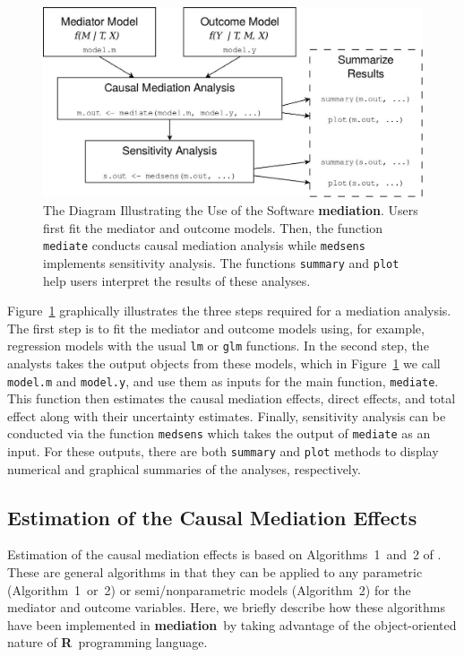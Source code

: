 \documentclass[11pt,letterpaper]{article}
\theoremstyle{plain}
\newcommand\bR{{\bf R}}
\newcommand\bmediation{{\bf mediation}}
\begin{document}
\begin{figure}[t]
  \begin{center}
    \includegraphics[scale=.35]{mediation-chart.jpg}
  \end{center}
  \caption{The Diagram Illustrating the Use of the Software
    \bmediation.  Users first fit the mediator and outcome models.
    Then, the function {\tt mediate} conducts causal mediation
    analysis while {\tt medsens} implements sensitivity analysis.  The
    functions {\tt summary} and {\tt plot} help users interpret the
    results of these analyses.} \label{fg:chart}
\end{figure}

Figure~\ref{fg:chart} graphically illustrates the three steps required
for a mediation analysis. The first step is to fit the mediator and
outcome models using, for example, regression models with the usual
\texttt{lm} or \texttt{glm} functions. In the second step, the
analysts takes the output objects from these models, which in
Figure~\ref{fg:chart} we call {\tt model.m} and {\tt model.y}, and use
them as inputs for the main function, {\tt mediate}. This function
then estimates the causal mediation effects, direct effects, and total
effect along with their uncertainty estimates. Finally, sensitivity
analysis can be conducted via the function {\tt medsens} which takes
the output of {\tt mediate} as an input.  For these outputs,
there are both {\tt summary} and {\tt plot} methods to
display numerical and graphical summaries of the analyses,
respectively.

\subsection{Estimation of the Causal Mediation Effects}

Estimation of the causal mediation effects is based on
Algorithms~1~and~2 of \citet{imai:keel:ting:10}. These are general
algorithms in that they can be applied to any parametric
(Algorithm~1~or~2) or semi/nonparametric models (Algorithm~2) for the
mediator and outcome variables.  Here, we briefly describe how these
algorithms have been implemented in \bmediation\ by taking advantage
of the object-oriented nature of \bR\ programming language.
\end{document}
